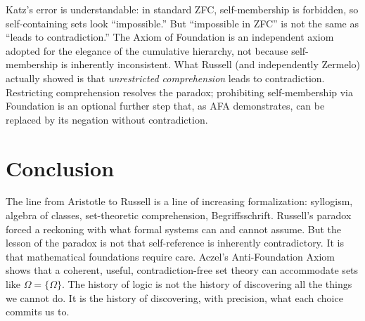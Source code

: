 \documentclass[12pt]{article}
\theoremstyle{definition}
\begin{document}
Katz's error is understandable: in standard ZFC, self-membership is forbidden, so self-containing sets look ``impossible.'' But ``impossible in ZFC'' is not the same as ``leads to contradiction.'' The Axiom of Foundation is an independent axiom adopted for the elegance of the cumulative hierarchy, not because self-membership is inherently inconsistent. What Russell (and independently Zermelo) actually showed is that \emph{unrestricted comprehension} leads to contradiction. Restricting comprehension resolves the paradox; prohibiting self-membership via Foundation is an optional further step that, as AFA demonstrates, can be replaced by its negation without contradiction.

\section{Conclusion}

The line from Aristotle to Russell is a line of increasing formalization: syllogism, algebra of classes, set-theoretic comprehension, Begriffsschrift. Russell's paradox forced a reckoning with what formal systems can and cannot assume. But the lesson of the paradox is not that self-reference is inherently contradictory. It is that mathematical foundations require care. Aczel's Anti-Foundation Axiom shows that a coherent, useful, contradiction-free set theory can accommodate sets like $\Omega = \{\Omega\}$. The history of logic is not the history of discovering all the things we cannot do. It is the history of discovering, with precision, what each choice commits us to.



\end{document}
